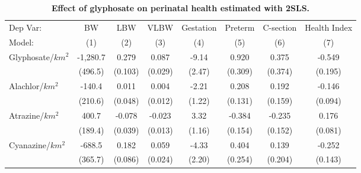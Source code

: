\begin{table}[htbp]
   \caption{\label{tab:main-outcomes-controls} \textbf{Effect of glyphosate on perinatal health estimated with 2SLS.}}
   \centering
   \begin{tabular}{lccccccc}
      \toprule
      Dep Var:                  & BW                      & LBW                     & VLBW                    & Gestation               & Preterm                 & C-section               & Health Index\\  
      Model:                    & (1)                     & (2)                     & (3)                     & (4)                     & (5)                     & (6)                     & (7)\\  
      \midrule 
      Glyphosate/$km^2$         & -1,280.7                & 0.279                   & 0.087                   & -9.14                   & 0.920                   & 0.375                   & -0.549\\   
                                & (496.5)                 & (0.103)                 & (0.029)                 & (2.47)                  & (0.309)                 & (0.374)                 & (0.195)\\   
      Alachlor/$km^2$           & -140.4                  & 0.011                   & 0.004                   & -2.21                   & 0.208                   & 0.192                   & -0.146\\   
                                & (210.6)                 & (0.048)                 & (0.012)                 & (1.22)                  & (0.131)                 & (0.159)                 & (0.094)\\   
      Atrazine/$km^2$           & 400.7                   & -0.078                  & -0.023                  & 3.32                    & -0.384                  & -0.235                  & 0.176\\   
                                & (189.4)                 & (0.039)                 & (0.013)                 & (1.16)                  & (0.154)                 & (0.152)                 & (0.081)\\   
      Cyanazine/$km^2$          & -688.5                  & 0.182                   & 0.059                   & -4.33                   & 0.404                   & 0.139                   & -0.252\\   
                                & (365.7)                 & (0.086)                 & (0.024)                 & (2.20)                  & (0.254)                 & (0.204)                 & (0.143)\\   

\end{tabular}
\end{table}
